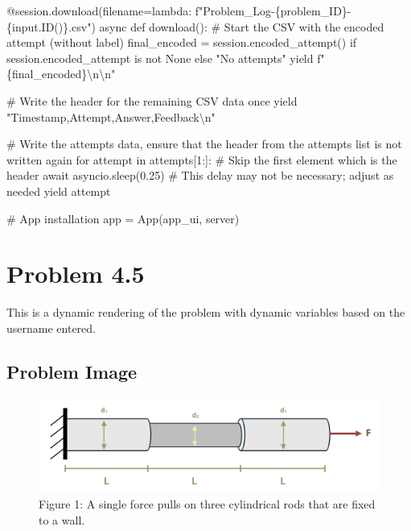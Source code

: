 \documentclass[
  letterpaper,
  DIV=11,
  numbers=noendperiod]{scrreprt}
\newenvironment{Shaded}{\begin{snugshade}}{\end{snugshade}}
\newcommand{\NormalTok}[1]{\textcolor[rgb]{0.00,0.23,0.31}{#1}}
\begin{document}
\begin{Shaded}
\begin{Highlighting}[]
\NormalTok{    @session.download(filename=lambda: f"Problem\_Log{-}\{problem\_ID\}{-}\{input.ID()\}.csv")}
\NormalTok{    async def download():}
\NormalTok{        \# Start the CSV with the encoded attempt (without label)}
\NormalTok{        final\_encoded = session.encoded\_attempt() if session.encoded\_attempt is not None else "No attempts"}
\NormalTok{        yield f"\{final\_encoded\}\textbackslash{}n\textbackslash{}n"}
        
\NormalTok{        \# Write the header for the remaining CSV data once}
\NormalTok{        yield "Timestamp,Attempt,Answer,Feedback\textbackslash{}n"}
        
\NormalTok{        \# Write the attempts data, ensure that the header from the attempts list is not written again}
\NormalTok{        for attempt in attempts[1:]:  \# Skip the first element which is the header}
\NormalTok{            await asyncio.sleep(0.25)  \# This delay may not be necessary; adjust as needed}
\NormalTok{            yield attempt}


\NormalTok{\# App installation}
\NormalTok{app = App(app\_ui, server)}
\end{Highlighting}
\end{Shaded}

\chapter*{Problem 4.5}\label{problem-4.5}


This is a dynamic rendering of the problem with dynamic variables based
on the username entered.

\section*{Problem Image}\label{problem-image-19}


\begin{figure}[H]

{\centering \includegraphics{images/188.png}

}

\caption{Figure 1: A single force pulls on three cylindrical rods that
are fixed to a wall.}

\end{figure}%
\end{document}
